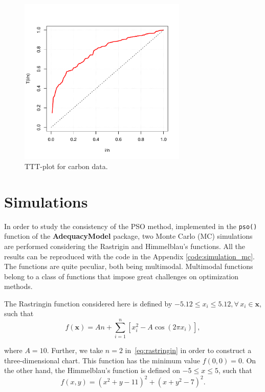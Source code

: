 \documentclass[10pt,letterpaper]{article}
\begin{document}
\begin{figure}[H]
\centering
\includegraphics[width=8cm,height=8cm]{tttplot}
\caption{TTT-plot for carbon data.}
\label{tttplot}
\end{figure}

\section{Simulations}

In order to study the consistency of the PSO method, implemented in the \texttt{pso()} function of the \textbf{AdequacyModel} package, two Monte Carlo (MC) simulations are performed con\-si\-der\-ing the Rastrigin and Himmelblau's functions. All the results can be reproduced with the code in the Appendix \ref{code:simulation_mc}. The functions are quite peculiar, both being multimodal. Mul\-ti\-mo\-dal functions belong to a class of functions that impose great challenges on optimization methods.
	
The Rastringin function considered here is defined by $-5.12 \leq x_i \leq 5.12, \forall\, x_i \in \bm{x}$, such that
\begin{equation}
f(\bm{x}) = An + \sum_{i = 1}^{n} [x_i^2 - A\cos(2\pi x_i) ],
\label{eq:rastringin}
\end{equation}

where $A = 10$. Further, we take $n=2$ in~\eqref{eq:rastringin} in order to construct a three-dimensional chart. This function has the minimum value $ f(0, 0) = 0 $. On the other hand, the Himmelblau's function is defined on $ -5 \leq x \leq 5 $, such that
\begin{equation}
f(x, y) = (x^2 + y -11)^2 + (x + y^2 - 7)^2.
\label{eq:himmelblaus}
\end{equation}
\end{document}
